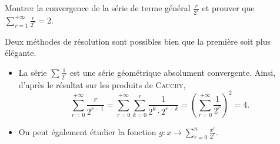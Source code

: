 \begin{exercice}
    Montrer la convergence de la série de terme général $\frac{r}{2^r}$ et prouver que $\sum\limits_{r=1}^{+ \infty} \frac{r}{2^r} = 2$. 
\end{exercice}

Deux méthodes de résolution sont possibles bien que la première soit plus élégante. 
\begin{itemize}
    \item La série $\sum \frac{1}{2^r}$ est une série géométrique absolument convergente. Ainsi, d'après le résultat sur les produits de \textsc{Cauchy}, 
    $$\sum_{r=0}^{+ \infty} \frac{r}{2^{r-1}} = \sum_{r=0}^{+ \infty} \sum_{k=0}^{r} \frac{1}{2^k \cdot 2^{r-k}} = \left( \sum_{r=0}^{+ \infty} \frac{1}{2^r} \right)^2 = 4.$$
    \item On peut également étudier la fonction $g : x \to \sum\limits_{r=0}^{n} \frac{x^r}{2^r}$.
\end{itemize}